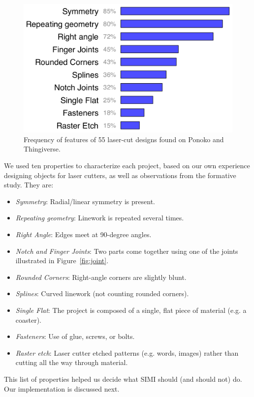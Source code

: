 \documentclass{article}
\begin{document}
\begin{figure}[h]
  \centering
  \includegraphics[width=0.9\linewidth]{img/ponoko-graph.pdf}
  \caption{Frequency of features of 55 laser-cut designs found on
    Ponoko and Thingiverse.}
  \label{fig:ponoko}
\end{figure}

We used ten properties to characterize each project, based on our own
experience designing objects for laser cutters, as well as
observations from the formative study. They are:

\begin{itemize}
\item \textit{Symmetry}: Radial/linear symmetry is present.
\item \textit{Repeating geometry}: Linework is repeated several times.
\item \textit{Right Angle}: Edges meet at 90-degree angles.
\item \textit{Notch and Finger Joints}: Two parts come together using one of
  the joints illustrated in Figure~\ref{fig:joint}.
\item \textit{Rounded Corners}: Right-angle corners are slightly blunt.
\item \textit{Splines}: Curved linework (not counting rounded corners).
\item \textit{Single Flat}: The project is composed of a single, flat
  piece of material (e.g. a coaster).
\item \textit{Fasteners}: Use of glue, screws, or bolts.
\item \textit{Raster etch}: Laser cutter etched patterns (e.g. words,
  images) rather than cutting all the way through material.
\end{itemize}

This list of properties helped us decide what SIMI should (and should
not) do. Our implementation is discussed next.
\end{document}
